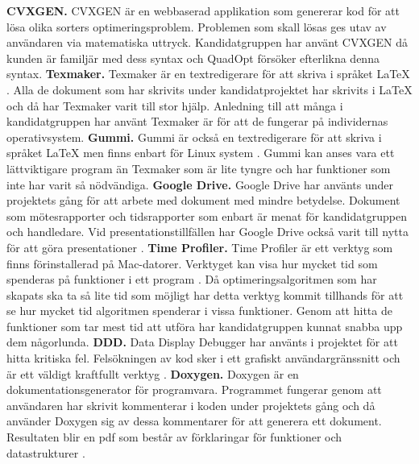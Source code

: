 \newline
\newline
\textbf{CVXGEN.} CVXGEN är en webbaserad applikation som genererar kod för att lösa olika sorters optimeringsproblem. Problemen som skall lösas ges utav av användaren via matematiska uttryck. \cite{cvxgen} Kandidatgruppen har använt CVXGEN då kunden är familjär med dess syntax och QuadOpt försöker efterlikna denna syntax. 
\newline
\newline
\textbf{Texmaker.} Texmaker är en textredigerare för att skriva i språket \LaTeX \hspace{0.2mm} \citep{texmaker}. Alla de dokument som har skrivits under kandidatprojektet har skrivits i {\LaTeX} och då har Texmaker varit till stor hjälp. Anledning till att många i kandidatgruppen har använt Texmaker är för att de fungerar på individernas operativsystem.
\newline
\newline
\textbf{Gummi.} Gummi är också en textredigerare för att skriva i språket {\LaTeX} men finns enbart för Linux system \citep{gummi}. Gummi kan anses vara ett lättviktigare program än Texmaker som är lite tyngre och har funktioner som inte har varit så nödvändiga.
\newline
\newline
\textbf{Google Drive.} Google Drive har använts under projektets gång för att arbete med dokument med mindre betydelse. Dokument som mötesrapporter och tidsrapporter som enbart är menat för kandidatgruppen och handledare. Vid presentationstillfällen har Google Drive också varit till nytta för att göra presentationer \citep{gdrive}.
\newline
\newline
\textbf{Time Profiler.} Time Profiler är ett verktyg som finns förinstallerad på Mac-datorer. Verktyget kan visa hur mycket tid som spenderas på funktioner i ett program \citep{timeprofiler}. Då optimeringsalgoritmen som har skapats ska ta så lite tid som möjligt har detta verktyg kommit tillhands för att se hur mycket tid algoritmen spenderar i vissa funktioner. Genom att hitta de funktioner som tar mest tid att utföra har kandidatgruppen kunnat snabba upp dem någorlunda.
\newline
\newline
\textbf{DDD.} Data Display Debugger har använts i projektet för att hitta kritiska fel. Felsökningen av kod sker i ett grafiskt användargränssnitt och är ett väldigt kraftfullt verktyg \citep{ddd}.
\newline
\newline
\textbf{Doxygen.} Doxygen är en dokumentationsgenerator för programvara. Programmet fungerar genom att användaren har skrivit kommenterar i koden under projektets gång och då använder Doxygen sig av dessa kommentarer för att generera ett dokument. Resultaten blir en pdf som består av förklaringar för funktioner och datastrukturer \citep{Doxygen}. 

